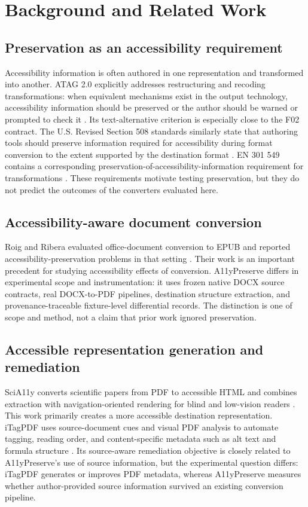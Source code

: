 \section{Background and Related Work}
\label{sec:background}

\subsection{Preservation as an accessibility requirement}

Accessibility information is often authored in one representation and transformed into another. ATAG 2.0 explicitly addresses restructuring and recoding transformations: when equivalent mechanisms exist in the output technology, accessibility information should be preserved or the author should be warned or prompted to check it \cite{atag20}. Its text-alternative criterion is especially close to the F02 contract. The U.S. Revised Section 508 standards similarly state that authoring tools should preserve information required for accessibility during format conversion to the extent supported by the destination format \cite{section508}. EN 301 549 contains a corresponding preservation-of-accessibility-information requirement for transformations \cite{etsi301549}. These requirements motivate testing preservation, but they do not predict the outcomes of the converters evaluated here.

\subsection{Accessibility-aware document conversion}

Roig and Ribera evaluated office-document conversion to EPUB and reported accessibility-preservation problems in that setting \cite{roig2015}. Their work is an important precedent for studying accessibility effects of conversion. A11yPreserve differs in experimental scope and instrumentation: it uses frozen native DOCX source contracts, real DOCX-to-PDF pipelines, destination structure extraction, and provenance-traceable fixture-level differential records. The distinction is one of scope and method, not a claim that prior work ignored preservation.

\subsection{Accessible representation generation and remediation}

SciA11y converts scientific papers from PDF to accessible HTML and combines extraction with navigation-oriented rendering for blind and low-vision readers \cite{wang2021scia11y}. This work primarily creates a more accessible destination representation. iTagPDF uses source-document cues and visual PDF analysis to automate tagging, reading order, and content-specific metadata such as alt text and formula structure \cite{mowar2026}. Its source-aware remediation objective is closely related to A11yPreserve's use of source information, but the experimental question differs: iTagPDF generates or improves PDF metadata, whereas A11yPreserve measures whether author-provided source information survived an existing conversion pipeline.

